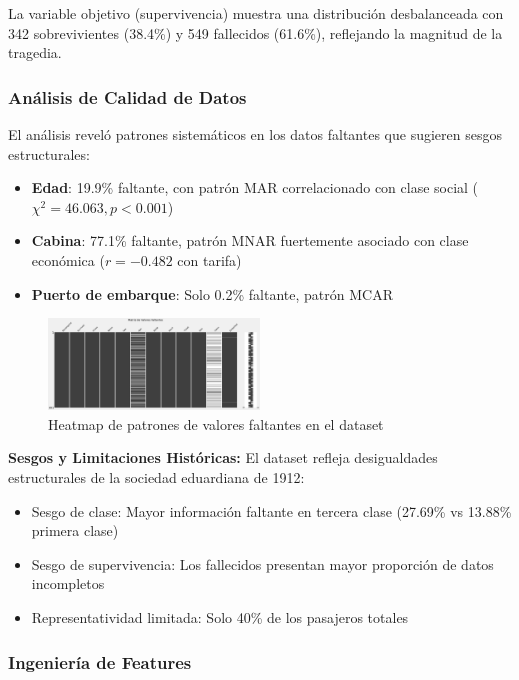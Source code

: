 \documentclass[conference]{IEEEtran}
\begin{document}
La variable objetivo (supervivencia) muestra una distribución desbalanceada con 342 sobrevivientes (38.4\%) y 549 fallecidos (61.6\%), reflejando la magnitud de la tragedia.

\subsubsection{Análisis de Calidad de Datos}

El análisis reveló patrones sistemáticos en los datos faltantes que sugieren sesgos estructurales:
\begin{itemize}
    \item \textbf{Edad}: 19.9\% faltante, con patrón MAR correlacionado con clase social ($\chi^2 = 46.063, p < 0.001$)
    \item \textbf{Cabina}: 77.1\% faltante, patrón MNAR fuertemente asociado con clase económica ($r = -0.482$ con tarifa)
    \item \textbf{Puerto de embarque}: Solo 0.2\% faltante, patrón MCAR
\end{itemize}

\begin{figure}[htbp]
\centering
\includegraphics[width=0.5\textwidth]{figures/missingness_heatmap.jpg}
\caption{Heatmap de patrones de valores faltantes en el dataset}
\label{fig:missingness_heatmap}
\end{figure}

\textbf{Sesgos y Limitaciones Históricas:}
El dataset refleja desigualdades estructurales de la sociedad eduardiana de 1912:
\begin{itemize}
\item Sesgo de clase: Mayor información faltante en tercera clase (27.69\% vs 13.88\% primera clase)
\item Sesgo de supervivencia: Los fallecidos presentan mayor proporción de datos incompletos
\item Representatividad limitada: Solo 40\% de los pasajeros totales
\end{itemize}

\subsubsection{Ingeniería de Features}
\end{document}
